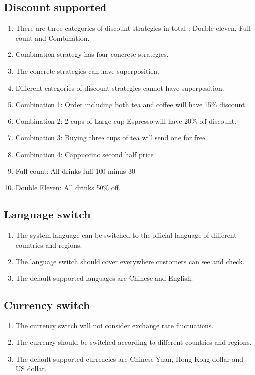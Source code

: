 \documentclass[a4paper]{report}
\begin{document}
\subsection{Discount supported}
\begin{enumerate}
\item There are three categories of discount strategies in total : Double eleven, Full count and Combination.
\item Combination strategy has four concrete strategies.
\item The concrete strategies can have superposition.
\item Different categories of discount strategies cannot have superposition.
\item Combination 1: Order including both tea and coffee will have 15\% discount.
\item Combination 2: 2 cups of Large-cup Espresso will have 20\% off discount.
\item Combination 3: Buying three cups of tea will send one for free.
\item Combination 4: Cappuccino second half price.
\item Full count: All drinks full 100 minus 30
\item Double Eleven: All drinks 50\% off.
\end{enumerate}

\subsection{Language switch}
\begin{enumerate}
\item The system language can be switched to the official language of different countries and regions.
\item The language switch should cover everywhere customers can see and check.
\item The default supported languages are Chinese and English.
\end{enumerate}

\subsection{Currency switch}
\begin{enumerate}
\item The currency switch will not consider exchange rate fluctuations.
\item The currency should be switched according to different countries and regions.
\item The default supported currencies are Chinese Yuan, Hong Kong dollar and US dollar.
\end{enumerate}
\end{document}
